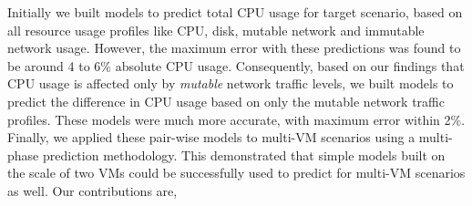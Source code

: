 Initially we built models to predict total CPU usage for target scenario,
based on all resource usage profiles like CPU, disk, mutable network
and immutable network usage. However, the maximum error with these
predictions was found to be around 4 to 6\% absolute CPU usage.
Consequently, based on our findings that CPU usage is affected only by
\textit{mutable} network traffic levels, we built models to
predict the difference in CPU usage based on only
the mutable network traffic profiles. These models were much more
accurate, with maximum error within 2\%. Finally, we applied these
pair-wise models to multi-VM scenarios using a multi-phase
prediction methodology. This demonstrated that simple models
built on the scale of two VMs could be successfully used to
predict for multi-VM scenarios as well.
%
Our contributions are,
